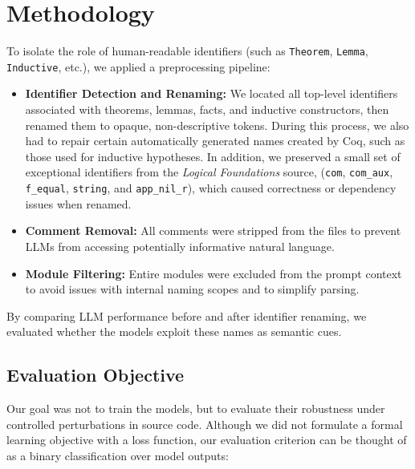 
\section{Methodology}
\label{sec:methodology}

To isolate the role of human-readable identifiers (such as \texttt{Theorem}, \texttt{Lemma}, \texttt{Inductive}, etc.), we applied a preprocessing pipeline:

\begin{itemize}
  \item \textbf{Identifier Detection and Renaming:} We located all top-level identifiers associated with theorems, lemmas, facts, and inductive constructors, then renamed them to opaque, non-descriptive tokens. During this process, we also had to repair certain automatically generated names created by Coq, such as those used for inductive hypotheses. In addition, we preserved a small set of exceptional identifiers from the \textit{Logical Foundations} source, (\texttt{com}, \texttt{com\_aux}, \texttt{f\_equal}, \texttt{string}, and \texttt{app\_nil\_r}), which caused correctness or dependency issues when renamed.
  \item \textbf{Comment Removal:} All comments were stripped from the files to prevent LLMs from accessing potentially informative natural language.
  \item \textbf{Module Filtering:} Entire modules were excluded from the prompt context to avoid issues with internal naming scopes and to simplify parsing.
\end{itemize}

By comparing LLM performance before and after identifier renaming, we evaluated whether the models exploit these names as semantic cues.

\subsection{Evaluation Objective}

Our goal was not to train the models, but to evaluate their robustness under controlled perturbations in source code. Although we did not formulate a formal learning objective with a loss function, our evaluation criterion can be thought of as a binary classification over model outputs:

